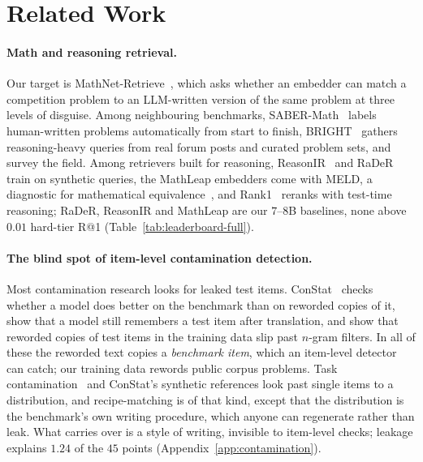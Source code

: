 \section{Related Work}
\label{sec:related}

\paragraph{Math and reasoning retrieval.}
Our target is MathNet-Retrieve~\citep{alshammari2026mathnet}, which asks whether an embedder can match a competition problem to an LLM-written version of the same problem at three levels of disguise. Among neighbouring benchmarks, SABER-Math~\citep{georgiev2026saber} labels human-written problems automatically from start to finish, BRIGHT~\citep{su2025bright} gathers reasoning-heavy queries from real forum posts and curated problem sets, and \citet{wei2026rirsurvey} survey the field. Among retrievers built for reasoning, ReasonIR~\citep{shao2025reasonir} and RaDeR~\citep{das2025rader} train on synthetic queries, the MathLeap embedders come with MELD, a diagnostic for mathematical equivalence~\citep{ye2026meld}, and Rank1~\citep{weller2025rank1} reranks with test-time reasoning; RaDeR, ReasonIR and MathLeap are our $7$--$8$B baselines, none above $0.01$ hard-tier R@1 (Table~\ref{tab:leaderboard-full}).

\paragraph{The blind spot of item-level contamination detection.}
Most contamination research looks for leaked test items. ConStat~\citep{dekoninck2024constat} checks whether a model does better on the benchmark than on reworded copies of it, \citet{yao2024crosslingual} show that a model still remembers a test item after translation, and \citet{yang2023rephrased} show that reworded copies of test items in the training data slip past $n$-gram filters. In all of these the reworded text copies a \emph{benchmark item}, which an item-level detector can catch; our training data rewords public corpus problems. Task contamination~\citep{li2024taskcontamination} and ConStat's synthetic references look past single items to a distribution, and recipe-matching is of that kind, except that the distribution is the benchmark's own writing procedure, which anyone can regenerate rather than leak. What carries over is a style of writing, invisible to item-level checks; leakage explains $1.24$ of the $45$ points (Appendix~\ref{app:contamination}).

